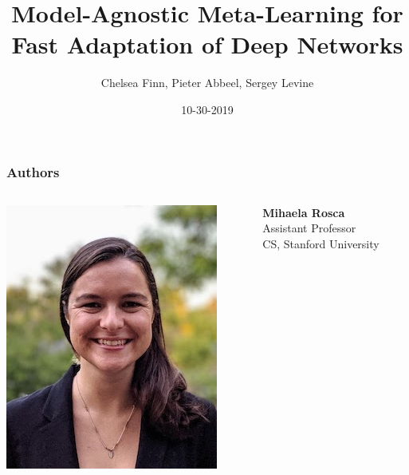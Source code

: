 \documentclass[compress]{beamer}
\title{Model-Agnostic Meta-Learning for Fast Adaptation of Deep Networks}
\author[Presentor: Shih-Ming Wang]{Chelsea Finn, Pieter Abbeel,  Sergey Levine}
\institute[]{Presented by Shih-Ming Wang}
\date{10-30-2019}
\begin{document}
\begin{frame}
    \maketitle
\end{frame}

\begin{frame}
    \frametitle{Authors}

    \begin{columns}
        \begin{column}{.3\textwidth}
            \includegraphics[width=\textwidth,height=.5\textheight]{auth1}
        \end{column}
        \begin{column}{.2\textwidth}
            \tiny
            \textbf{Mihaela Rosca} \\
            Assistant Professor \\
            CS, Stanford University \\
        \end{column}

\end{columns}
\end{frame}
\end{document}
